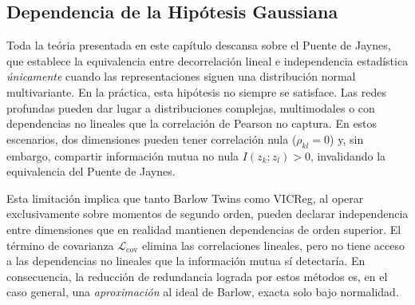 \subsection{Dependencia de la Hipótesis Gaussiana}

Toda la teória presentada en este capítulo descansa sobre el Puente de Jaynes, que establece la equivalencia entre decorrelación lineal e independencia estadística \textit{únicamente} cuando las representaciones siguen una distribución normal multivariante. En la práctica, esta hipótesis no siempre se satisface. Las redes profundas pueden dar lugar a distribuciones complejas, multimodales o con dependencias no lineales que la correlación de Pearson no captura. En estos escenarios, dos dimensiones pueden tener correlación nula ($\rho_{kl} = 0$) y, sin embargo, compartir información mutua no nula $I(z_k; z_l) > 0$, invalidando la equivalencia del Puente de Jaynes.

Esta limitación implica que tanto Barlow Twins como VICReg, al operar exclusivamente sobre momentos de segundo orden, pueden declarar independencia entre dimensiones que en realidad mantienen dependencias de orden superior. El término de covarianza $\mathcal{L}_{\text{cov}}$ elimina las correlaciones lineales, pero no tiene acceso a las dependencias no lineales que la información mutua sí detectaría. En consecuencia, la reducción de redundancia lograda por estos métodos es, en el caso general, una \textit{aproximación} al ideal de Barlow, exacta solo bajo normalidad.

